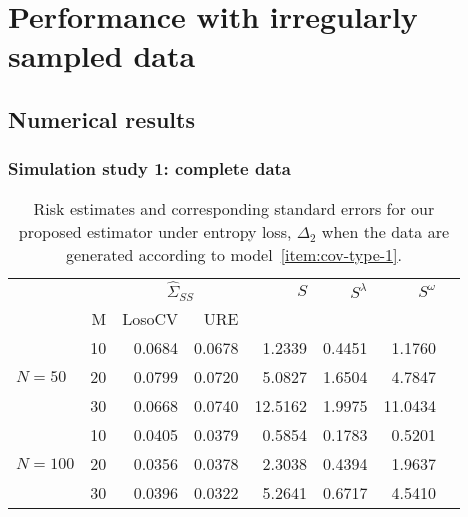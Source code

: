 \documentclass[12pt]{article}
\newcommand*\needsparaphrased{\color{red}}
\theoremstyle{definition}
\begin{document}








\section{Performance with irregularly sampled data}



\bigskip


{\needsparaphrased{TODO: remember to cite the nlme package for fitting the MA(1) and CS oracle models.}}





\subsection{Numerical results}
\subsubsection{Simulation study 1: complete data} \label{benchmarking-results}

\setlength{\dashlinedash}{0.5pt}
\setlength{\dashlinegap}{1pt}
\setlength{\arrayrulewidth}{0.2pt}

\begin{table}[H] \label{table:simulation-1-entropy-loss-sigma-1}
\centering
\caption{Risk estimates and corresponding standard errors for our proposed estimator under entropy loss, $\Delta_2$ when the data are generated according to model~\ref{item:cov-type-1}.} 
\begin{tabular}{l|r|rrrrrr}
&  & \multicolumn{2}{c}{$\hat{\Sigma}_{SS}$} & $S$ & $S^\lambda$ & $S^\omega$ \\ 
&M & \mbox{LosoCV} & \mbox{URE} &  \\ 
  \hline
&    10 & 0.0684 & 	0.0678	&1.2339 & 0.4451 & 1.1760\\ 
$N = 50$ &    20 & 0.0799 & 	0.0720	&5.0827 & 1.6504 & 4.7847 \\ 
  &    30 & 0.0668 &	0.0740	 &12.5162  & 1.9975 & 11.0434 \\ 
   \hdashline
 &    10 & 0.0405 & 0.0379 & 0.5854  & 0.1783 & 0.5201 \\ 
$N = 100$ &    20 & 0.0356 &  0.0378 & 2.3038 & 0.4394 & 1.9637 \\ 
  &    30 & 0.0396 & 0.0322  &5.2641 & 0.6717 & 4.5410 \\ 
\end{tabular}
\end{table}
\end{document}

